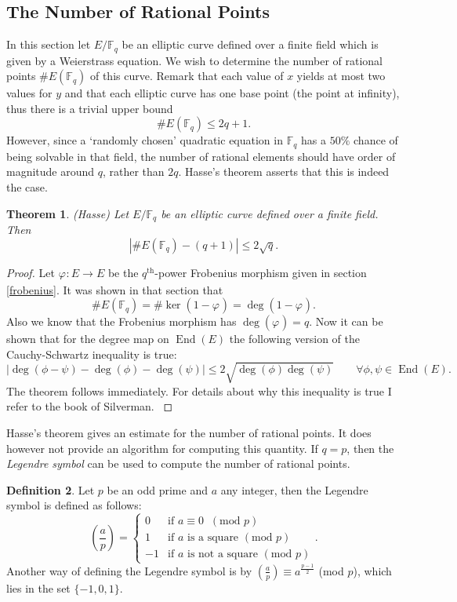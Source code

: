 \documentclass{article}
\numberwithin{equation}{section}
\newtheorem{theorem}{Theorem}[subsection]
\theoremstyle{definition}
\newtheorem{definition}[theorem]{Definition}
\newcommand{\FF}[1]{{\mathbb F}_{#1}} %
\newcommand{\frob}[1][]{\varphi_{#1}} %
\newcommand{\degree}[1]{\operatorname{deg} \left(#1\right)} %
\newcommand{\kernel}[1]{\operatorname{ker} \left(#1\right)} %
\newcommand{\Endring}[1]{\operatorname{End} (#1)} %
\newcommand{\leg}[2]{\left( \frac{#1}{#2}\right)} %
\begin{document}
\subsection{The Number of Rational Points}
In this section let $E/\FF{q}$ be an elliptic curve defined over a finite field which is given by a Weierstrass equation. We wish to determine the number of rational points $\#E(\FF{q})$ of this curve. Remark that each value of $x$ yields at most two values for $y$ and that each elliptic curve has one base point (the point at infinity), thus there is a trivial upper bound $$\#E(\FF{q}) \leq 2q+1.$$ However, since a `randomly chosen' quadratic equation in $\FF{q}$ has a $50\%$ chance of being solvable in that field, the number of rational elements should have order of magnitude around $q$, rather than $2q$. Hasse's theorem asserts that this is indeed the case.

\begin{theorem} (Hasse)
Let $E/\FF{q}$ be an elliptic curve defined over a finite field. Then $$|\#E(\FF{q}) -(q+1)| \leq 2 \sqrt{q}.$$
\end{theorem}

\begin{proof}
Let $\frob:E \rightarrow E$ be the $q^\text{th}$-power Frobenius morphism given in section \ref{frobenius}. It was shown in that section that $$\#E(\FF{q}) = \#\kernel{1-\frob}=\degree{1-\frob}.$$ Also we know that the Frobenius morphism has $\degree{\frob}=q$. Now it can be shown that for the degree map on $\Endring{E}$ the following version of the Cauchy-Schwartz inequality is true: $$|\degree{\phi-\psi} -\degree{\phi}-\degree{\psi}| \leq 2\sqrt{\degree{\phi}\degree{\psi}} \qquad \forall \phi,\psi \in \Endring{E}.$$ The theorem follows immediately. For details about why this inequality is true I refer to the book of Silverman. \cite[V.1.2.]{Silverman}
\end{proof}

Hasse's theorem gives an estimate for the number of rational points. It does however not provide an algorithm for computing this quantity. If $q = p$, then the \emph{Legendre symbol} can be used to compute the number of rational points.

\begin{definition}\label{legendresymbol}
Let $p$ be an odd prime and $a$ any integer, then the Legendre symbol is defined as follows:
$$\leg{a}{p}=\left \{ \begin{array}{ll} 0 &\text{if } a \equiv 0 \;\; (\text{mod }p)\\ 1 &\text{if } a \text{ is a square } (\text{mod }p)\\ -1 & \text{if } a \text{ is not a square } (\text{mod }p) \end{array}.$$
Another way of defining the Legendre symbol is by $\leg{a}{p}\equiv a^{\frac{p-1}{2}}$ (mod $p$), which lies in the set $\{-1,0,1\}$.
\end{definition}
\end{document}
